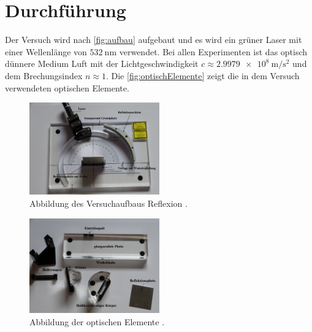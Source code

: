 \section{Durchführung}
\label{sec:Durchführung}

Der Versuch wird nach \autoref{fig:aufbau} aufgebaut und es wird ein grüner Laser mit einer Wellenlänge von $\SI{532}{\nano\meter}$ verwendet. 
Bei allen Experimenten ist das optisch dünnere Medium Luft mit der Lichtgeschwindigkeit $c\approx \SI{2,9979e8}{\meter\per\second\squared}$ und dem Brechungsindex $n\approx 1$.
Die \autoref{fig:optischElemente} zeigt die in dem Versuch verwendeten optischen Elemente.
\begin{figure}[H]
    \centering
    \includegraphics[width=0.5\textwidth]{data/aufbau1.png}
    \caption{Abbildung des Versuchaufbaus Reflexion \cite{Anleitung400}.}
    \label{fig:aufbau}
\end{figure}

\begin{figure}[H]
    \centering
    \includegraphics[width=0.5\textwidth]{data/optischeElemente.png}
    \caption{Abbildung der optischen Elemente \cite{Anleitung400}.}
    \label{fig:optischElemente}
\end{figure}

